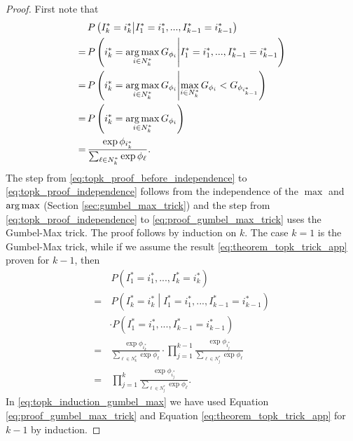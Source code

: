 \begin{proof}
First note that
\begin{align}
    & \, P\left(I^*_k = i^*_k \middle| I^*_1 = i^*_1, ..., I^*_{k-1} = i^*_{k-1} \right) \nonumber \\
    =& \, P\left(i^*_k = \operatorname*{arg\,max}_{i \in N^*_k}{ G_{\phi_i} } \middle| I^*_1 = i^*_1, ..., I^*_{k-1} = i^*_{k-1} \right) \nonumber \\
    =& \, P\left(i^*_k = \operatorname*{arg\,max}_{i \in N^*_k}{ G_{\phi_i} } \middle|  \max_{i \in N^*_k}{ G_{\phi_i} } < G_{\phi_{i^*_{k-1}}}\right) \label{eq:topk_proof_before_independence} \\
    =& \, P\left(i^*_k = \operatorname*{arg\,max}_{i \in N^*_k}{ G_{\phi_i} }\right) \label{eq:topk_proof_independence} \\
    =& \, \frac{\exp{\phi_{i^*_k}}}{\sum_{\ell \in N^*_k} \exp{\phi_\ell}} \label{eq:proof_gumbel_max_trick}. 
\end{align}
The step from \eqref{eq:topk_proof_before_independence} to \eqref{eq:topk_proof_independence} follows from the independence of the $\max$ and $\operatorname*{arg\,max}$ (Section \ref{sec:gumbel_max_trick}) and the step from \eqref{eq:topk_proof_independence} to \eqref{eq:proof_gumbel_max_trick} uses the Gumbel-Max trick.
The proof follows by induction on $k$. The case $k = 1$ is the Gumbel-Max trick, while if we assume the result \eqref{eq:theorem_topk_trick_app} proven for $k - 1$, then
\begin{align}
    & \, P\left(I^*_1 = i^*_1, ..., I^*_k = i^*_k\right) \nonumber\\
    = & \, P\left(I^*_k = i^*_k \middle| I^*_1 = i^*_1, ..., I^*_{k-1} = i^*_{k-1}\right) \nonumber\\
    & \cdot P\left(I^*_1 = i^*_1, ..., I^*_{k-1} = i^*_{k-1}\right) \nonumber\\
    = & \, \frac{\exp{\phi_{i^*_k}}}{\sum_{\ell \in N^*_k} \exp{\phi_\ell}} \cdot \prod_{j=1}^{k-1} \frac{\exp{\phi_{i^*_j}}}{\sum_{\ell \in N^*_j} \exp{\phi_\ell}} %
    \label{eq:topk_induction_gumbel_max} \\
    = & \, \prod_{j=1}^k \frac{\exp{\phi_{i^*_j}}}{\sum_{\ell \in N^*_j} \exp{\phi_\ell}}. \nonumber
\end{align}
In \eqref{eq:topk_induction_gumbel_max} we have used Equation \eqref{eq:proof_gumbel_max_trick} and Equation \eqref{eq:theorem_topk_trick_app} for $k - 1$ by induction.
\end{proof}

